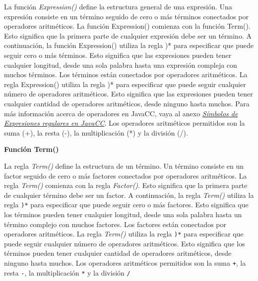 \noindent La función \textit{Expression()} define la estructura general de una expresión. Una expresión consiste en un término seguido de cero o más términos conectados por operadores aritméticos. La función Expression() comienza con la función Term(). Esto significa que la primera parte de cualquier expresión debe ser un término. A continuación, la función Expression() utiliza la regla )* para especificar que puede seguir cero o más términos. Esto significa que las expresiones pueden tener cualquier longitud, desde una sola palabra hasta una expresión compleja con muchos términos.
Los términos están conectados por operadores aritméticos. La regla Expression() utiliza la regla )* para especificar que puede seguir cualquier número de operadores aritméticos. Esto significa que las expresiones pueden tener cualquier cantidad de operadores aritméticos, desde ninguno hasta muchos. Para más información acerca de operadores en JavaCC, vaya al anexo \hyperref[sec:simbolosdeexpresionesregulares]{\textit{Símbolos de Expresiones regulares en JavaCC}}.
Los operadores aritméticos permitidos son la suma (+), la resta (-), la multiplicación (*) y la división (/).

\phantom{text}

\noindent \textbf{Función Term()}

\phantom{text}

\lstset{inputencoding=utf8/latin1}


\noindent La regla \textit{Term()} define la estructura de un término. Un término consiste en un factor seguido de cero o más factores conectados por operadores aritméticos. La regla \textit{Term()} comienza con la regla \textit{Factor()}. Esto significa que la primera parte de cualquier término debe ser un factor. A continuación, la regla \textit{Term()} utiliza la regla \lstinline|)*| para especificar que puede seguir cero o más factores. Esto significa que los términos pueden tener cualquier longitud, desde una sola palabra hasta un término complejo con muchos factores.
Los factores están conectados por operadores aritméticos. La regla \textit{Term()} utiliza la regla \lstinline|)*| para especificar que puede seguir cualquier número de operadores aritméticos. Esto significa que los términos pueden tener cualquier cantidad de operadores aritméticos, desde ninguno hasta muchos.
Los operadores aritméticos permitidos son la suma \lstinline|+|, la resta \lstinline|-|, la multiplicación \lstinline|*| y la división \lstinline|/|

\phantom{text}

